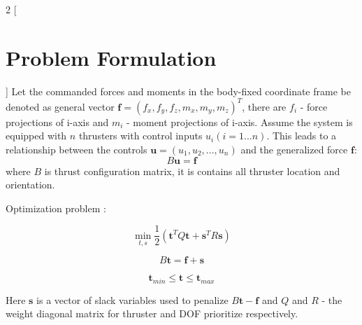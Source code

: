 \documentclass[a0,portrait]{a0poster}
\begin{document}
\begin{minipage}[t]{0.48\linewidth}
\begin{multicols}{2}
[
\section*{Problem Formulation}
]
Let the commanded forces and moments in the body-fixed coordinate frame be denoted as general vector $\boldsymbol{f} = (f_x, f_y, f_z, m_x, m_y, m_z)^T$, there are $f_i$ - force projections of i-axis and $m_i$ - moment projections of i-axis. Assume the system is equipped with $n$ thrusters with control inputs $u_i (i = 1...n)$. This leads to a relationship between the controls $\boldsymbol{u}=(u_1,u_2,...,u_n)$ and the generalized force $\boldsymbol{f}$:
\begin{equation}
	B\boldsymbol{u} = \boldsymbol{f}
\end{equation}
where $B$ is thrust configuration matrix, it is contains all thruster location and orientation.

Optimization problem \cite{allocation_1}:

\begin{equation}
	\min\limits_{t,s} \frac{1}{2}(\boldsymbol{t}^TQ\boldsymbol{t}+\boldsymbol{s}^TR\boldsymbol{s})
	\label{eq:problem}
\end{equation}

\begin{equation*}
	B\boldsymbol{t} = \boldsymbol{f} + \boldsymbol{s}
\end{equation*}

\begin{equation*}
	\boldsymbol{t}_{min} \leq \boldsymbol{t} \leq \boldsymbol{t}_{max}
\end{equation*}

Here $\boldsymbol{s}$ is a vector of slack variables used to penalize $B\boldsymbol{t} - \boldsymbol{f}$ and $Q$ and $R$ - the weight diagonal matrix for thruster and DOF prioritize respectively.
\end{multicols}
\end{minipage}
\end{document}
